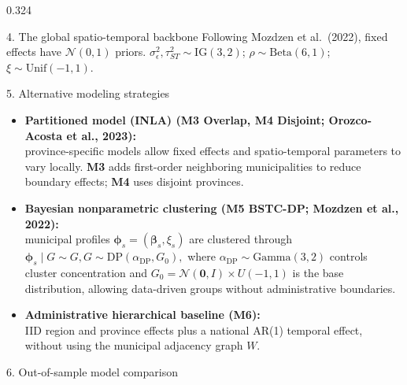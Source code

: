 \documentclass[final]{beamer}
\newcommand{\model}[1]{\textbf{#1}}
\begin{document}
\begin{frame}[t]
\begin{columns}[t,totalwidth=\textwidth]
\begin{column}{0.324\textwidth}
\begin{block}{4. The global spatio-temporal backbone}
\vspace{0.5cm}
Following Mozdzen et al.\ (2022), fixed effects have
$\mathcal{N}(0,1)$ priors.
$\sigma_\epsilon^2,\tau_{ST}^2\sim\mathrm{IG}(3,2)$;
$\rho\sim\mathrm{Beta}(6,1)$;
$\xi\sim\mathrm{Unif}(-1,1)$.
\end{block}

\vspace{0.5cm}

\begin{block}{5. Alternative modeling strategies}

\justifying

\begin{itemize}
\item \textbf{Partitioned model (INLA) (\model{M3} Overlap, \model{M4} Disjoint;
Orozco-Acosta et al., 2023):}\\

 province-specific models allow fixed effects and spatio-temporal
parameters to vary locally. \model{M3} adds first-order neighboring
municipalities to reduce boundary effects; \model{M4} uses disjoint provinces.

\item \textbf{Bayesian nonparametric clustering (\model{M5 BSTC-DP}; Mozdzen et al., 2022):}\\

\noindent municipal profiles $\bm{\phi}_s=(\bm{\beta}_s,\xi_s)$ are clustered through
\(\bm{\phi}_s\mid G\sim G,
G\sim\mathrm{DP}(\alpha_{\mathrm{DP}},G_0),
\)
where $\alpha_{\mathrm{DP}}\sim\mathrm{Gamma}(3,2)$ controls cluster concentration and
$G_0=\mathcal{N}(\mathbf{0},I)\times U(-1,1)$ is the base distribution, allowing data-driven groups without administrative boundaries.

\item \textbf{Administrative hierarchical baseline (\model{M6}):}\\
\noindent IID region and province effects plus a national AR(1) temporal effect,
without using the municipal adjacency graph $W$.

\end{itemize}
\end{block}

\vspace{0.5cm}

\begin{block}{6. Out-of-sample model comparison}


\end{block}
\end{column}
\end{columns}
\end{frame}
\end{document}
